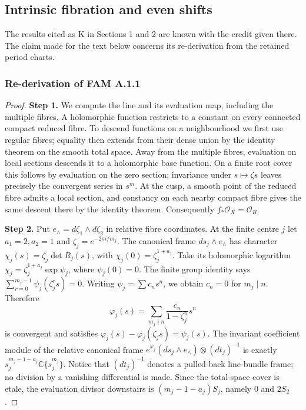 \subsection{Intrinsic fibration and even shifts}\label{app:known-periods}
The results cited as K in Sections 1 and 2 are known with the credit given there. The claim made for the text below concerns its re-derivation from the retained period charts.
\subsubsection{Re-derivation of FAM A.1.1}
\begin{proof}
\par\smallskip\noindent\textbf{Step 1.} We compute the line and its evaluation map, including the multiple fibres. A holomorphic function restricts to a constant on every connected compact reduced fibre. To descend functions on a neighbourhood we first use regular fibres; equality then extends from their dense union by the identity theorem on the smooth total space. Away from the multiple fibres, evaluation on local sections descends it to a holomorphic base function. On a finite root cover this follows by evaluation on the zero section; invariance under $s\mapsto\zeta s$ leaves precisely the convergent series in $s^m$. At the cusp, a smooth point of the reduced fibre admits a local section, and constancy on each nearby compact fibre gives the same descent there by the identity theorem. Consequently $f_*\mathcal O_X=\mathcal O_B$.

\par\smallskip\noindent\textbf{Step 2.} Put $e_\wedge=d\zeta_1\wedge d\zeta_2$ in relative fibre coordinates. At the finite centre $j$ let $a_1=2,a_2=1$ and $\zeta_j=e^{-2\pi i/m_j}$. The canonical frame $ds_j\wedge e_\wedge$ has character $\chi_j(s)=\zeta_j\det R_j(s)$, with $\chi_j(0)=\zeta_j^{1+a_j}$. Take its holomorphic logarithm $\chi_j=\zeta_j^{1+a_j}\exp\psi_j$, where $\psi_j(0)=0$. The finite group identity says $\sum_{r=0}^{m_j-1}\psi_j(\zeta_j^r s)=0$. Writing $\psi_j=\sum c_ns^n$, we obtain $c_n=0$ for $m_j\mid n$. Therefore
\[
 \varphi_j(s)=\sum_{m_j\nmid n}\frac{c_n}{1-\zeta_j^n}s^n
\]
is convergent and satisfies $\varphi_j(s)-\varphi_j(\zeta_js)=\psi_j(s)$. The invariant coefficient module of the relative canonical frame
$e^{\varphi_j}(ds_j\wedge e_\wedge)\otimes(dt_j)^{-1}$ is exactly
$s_j^{m_j-1-a_j}\mathbb C\{s_j^{m_j}\}$. Notice that $(dt_j)^{-1}$ denotes a pulled-back line-bundle frame; no division by a vanishing differential is made. Since the total-space cover is etale, the evaluation divisor downstairs is $(m_j-1-a_j)S_j$, namely $0$ and $2S_2$.


\end{proof}
